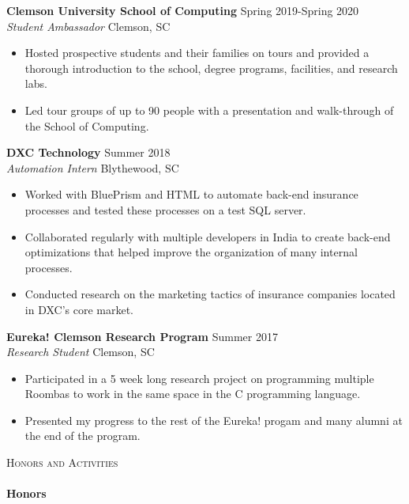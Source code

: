 \documentclass[a4paper]{article}
\newcommand{\lineunder} {
    \vspace*{-8pt} \\
    \hspace*{-18pt} \hrulefill \\
}
\newcommand{\header} [1] {
    {\hspace*{-18pt}\vspace*{6pt} \textsc{#1}}
    \vspace*{-6pt} \lineunder
}
\newcommand{\beginninglist} [4] {
	
	\noindent \textbf{#1} \hfill \hfill #3\\ \noindent \textit{#2} \hfill \hfill #4 \\    
}
\begin{document}
\beginninglist {Clemson University School of Computing} {Student Ambassador} {Spring 2019-Spring 2020} {Clemson, SC} \vspace{-8pt}
\begin{itemize}
	\item Hosted prospective students and their families on tours and provided a thorough introduction to the school, degree programs, facilities, and research labs.\vspace{-5pt}
	\item Led tour groups of up to 90 people with a presentation and walk-through of the School of Computing. \vspace{-5pt}
\end{itemize}	
\beginninglist {DXC Technology} {Automation Intern} {Summer 2018} {Blythewood, SC} \vspace{-8pt}
\begin{itemize}
	\item Worked with BluePrism and HTML to automate back-end insurance processes and tested these processes on a test SQL server.\vspace{-5pt}
	\item Collaborated regularly with multiple developers in India to create back-end optimizations that helped improve the organization of many internal processes.\vspace{-5pt}
	\item Conducted research on the marketing tactics of insurance companies located in DXC's core market.\vspace{-5pt}
\end{itemize}

\beginninglist {Eureka! Clemson Research Program} {Research Student} {Summer 2017} {Clemson, SC}
\vspace{-8pt}
\begin{itemize}
	\item Participated in a 5 week long research project on programming multiple Roombas to work in the same space in the C programming language.  \vspace{-5pt}
	\item Presented my progress to the rest of the Eureka! progam and many alumni at the end of the program. \vspace{-5pt}
\end{itemize}

\header {Honors and Activities}

\textbf{Honors} \vspace{-5pt}
\end{document}
